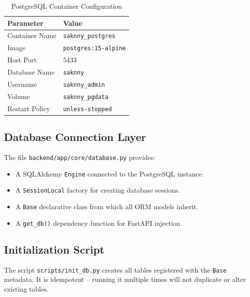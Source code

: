 \documentclass[12pt,a4paper]{article}
\begin{document}
\begin{table}[h!]
\centering
\caption{PostgreSQL Container Configuration}
\begin{tabular}{@{}ll@{}}
\toprule
\textbf{Parameter}    & \textbf{Value}           \\ \midrule
Container Name        & \texttt{saknny\_postgres} \\
Image                 & \texttt{postgres:15-alpine} \\
Host Port             & 5433                     \\
Database Name         & \texttt{saknny}          \\
Username              & \texttt{saknny\_admin}   \\
Volume                & \texttt{saknny\_pgdata}  \\
Restart Policy        & \texttt{unless-stopped}  \\
\bottomrule
\end{tabular}
\end{table}

\subsection{Database Connection Layer}

The file \texttt{backend/app/core/database.py} provides:

\begin{itemize}[noitemsep]
    \item A SQLAlchemy \texttt{Engine} connected to the PostgreSQL instance.
    \item A \texttt{SessionLocal} factory for creating database sessions.
    \item A \texttt{Base} declarative class from which all ORM models inherit.
    \item A \texttt{get\_db()} dependency function for FastAPI injection.
\end{itemize}

\subsection{Initialization Script}

The script \texttt{scripts/init\_db.py} creates all tables registered with the \texttt{Base} metadata. It is idempotent -- running it multiple times will not duplicate or alter existing tables.

\end{document}
